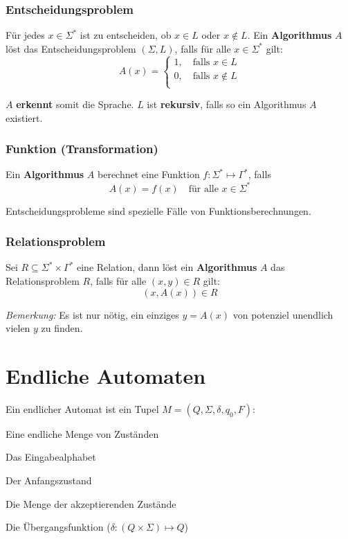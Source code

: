 \documentclass[11pt]{article}
\begin{document}
\subsubsection{Entscheidungsproblem}
Für jedes $x \in \Sigma^*$ ist zu entscheiden, ob $x \in L$ oder $x \notin L$. Ein \textbf{Algorithmus} $A$ löst das Entscheidungsproblem $(\Sigma, L)$, falls für alle $x \in \Sigma^*$ gilt:
\begin{equation*}
	A(x) = \begin{cases}
		1, \quad\text{falls $x \in L$} \\
		0, \quad\text{falls $x \notin L$} \\
	\end{cases}
\end{equation*}

$A$ \textbf{erkennt} somit die Sprache. $L$ ist \textbf{rekursiv}, falls so ein Algorithmus $A$ existiert.

\subsubsection{Funktion (Transformation)}
Ein \textbf{Algorithmus} $A$ berechnet eine Funktion $f: \Sigma^* \mapsto \Gamma^*$, falls
\begin{equation*}
	A(x) = f(x) \quad\text{für alle $x \in \Sigma^*$}
\end{equation*}

Entscheidungsprobleme sind spezielle Fälle von Funktionsberechnungen.

\subsubsection{Relationsproblem}
Sei $R \subseteq \Sigma^*\times\Gamma^*$ eine Relation, dann löst ein \textbf{Algorithmus} $A$ das Relationsproblem $R$, falls für alle $(x,y) \in R$ gilt:
\begin{equation*}
	(x, A(x)) \in R
\end{equation*}

\emph{Bemerkung:} Es ist nur nötig, ein einziges $y = A(x)$ von potenziel unendlich vielen $y$ zu finden.

\section{Endliche Automaten}

Ein endlicher Automat ist ein Tupel $M = (Q, \Sigma, \delta, q_0, F)$:
\begin{description}[labelindent=16pt,style=multiline,leftmargin=2.5cm, noitemsep]
	\item[$Q$:] Eine endliche Menge von Zuständen
	\item[$\Sigma$:] Das Eingabealphabet
	\item[$q_0 \in Q$:] Der Anfangszustand
	\item[$F \subseteq Q$:] Die Menge der akzeptierenden Zustände
	\item[$\delta$:] Die Übergangsfunktion ($\delta: (Q\times\Sigma) \mapsto Q$)
\end{description}
\end{document}
